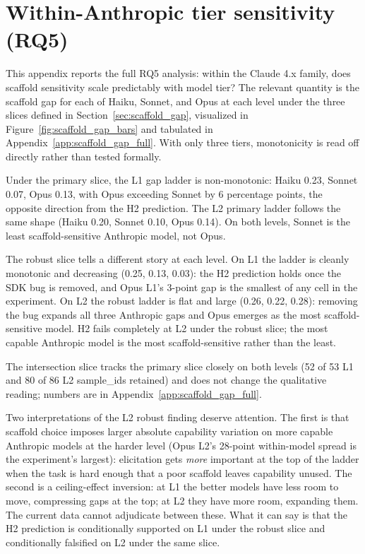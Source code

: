 \documentclass[10pt]{article} %
\begin{document}
\FloatBarrier

\section{Within-Anthropic tier sensitivity (RQ5)}\label{app:tier_sensitivity}
 
    This appendix reports the full RQ5 analysis: within the Claude 4.x family, does scaffold sensitivity scale predictably with model tier? The relevant quantity is the scaffold gap for each of Haiku, Sonnet, and Opus at each level under the three slices defined in Section~\ref{sec:scaffold_gap}, visualized in Figure~\ref{fig:scaffold_gap_bars} and tabulated in Appendix~\ref{app:scaffold_gap_full}. With only three tiers, monotonicity is read off directly rather than tested formally.
     
    Under the primary slice, the L1 gap ladder is non-monotonic: Haiku 0.23, Sonnet 0.07, Opus 0.13, with Opus exceeding Sonnet by 6 percentage points, the opposite direction from the H2 prediction. The L2 primary ladder follows the same shape (Haiku 0.20, Sonnet 0.10, Opus 0.14). On both levels, Sonnet is the least scaffold-sensitive Anthropic model, not Opus.
     
    The robust slice tells a different story at each level. On L1 the ladder is cleanly monotonic and decreasing (0.25, 0.13, 0.03): the H2 prediction holds once the SDK bug is removed, and Opus L1's 3-point gap is the smallest of any cell in the experiment. On L2 the robust ladder is flat and large (0.26, 0.22, 0.28): removing the bug expands all three Anthropic gaps and Opus emerges as the most scaffold-sensitive model. H2 fails completely at L2 under the robust slice; the most capable Anthropic model is the most scaffold-sensitive rather than the least.
     
    The intersection slice tracks the primary slice closely on both levels (52 of 53 L1 and 80 of 86 L2 sample\_ids retained) and does not change the qualitative reading; numbers are in Appendix~\ref{app:scaffold_gap_full}.
     
    Two interpretations of the L2 robust finding deserve attention. The first is that scaffold choice imposes larger absolute capability variation on more capable Anthropic models at the harder level (Opus L2's 28-point within-model spread is the experiment's largest): elicitation gets \emph{more} important at the top of the ladder when the task is hard enough that a poor scaffold leaves capability unused. The second is a ceiling-effect inversion: at L1 the better models have less room to move, compressing gaps at the top; at L2 they have more room, expanding them. The current data cannot adjudicate between these. What it can say is that the H2 prediction is conditionally supported on L1 under the robust slice and conditionally falsified on L2 under the same slice.
\end{document}

